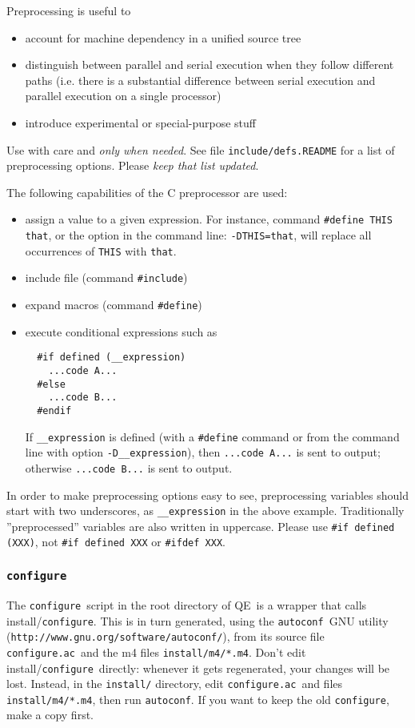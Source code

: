 \documentclass[12pt,a4paper]{article}
\def\qe{QE}
\def\configure{\texttt{configure}}
\def\configurac{\texttt{configure.ac}}
\def\autoconf{\texttt{autoconf}}
\begin{document}
Preprocessing is useful to
\begin{itemize}
\item account for machine dependency in a unified source tree
\item distinguish between parallel and serial execution when they
follow different paths (i.e. there is a substantial difference between
serial execution and parallel execution on a single processor)
\item  introduce experimental or special-purpose stuff
\end{itemize}
Use with care and {\em only when needed}. See file
\texttt{include/defs.README} for a list of preprocessing
options. Please {\em keep that list updated}.

The following capabilities of the C preprocessor are used:
\begin{itemize}
\item assign a value to a given expression. For instance, command
  \texttt{\#define THIS that}, or the option in the command line:
  \texttt{-DTHIS=that}, will replace all occurrences of \texttt{THIS}
  with \texttt{that}.
\item include file (command \texttt{\#include})
\item expand macros (command \texttt{\#define})
\item execute conditional expressions such as
\begin{verbatim}
  #if defined (__expression)
    ...code A...
  #else
    ...code B...
  #endif
\end{verbatim}
If \texttt{\_\_expression} is defined (with a \texttt{\#define} command
or from the command line with option \texttt{-D\_\_expression}),
then  \texttt{...code A...} is sent to output; otherwise
\texttt{...code B...} is sent to output.

\end{itemize}
In order to make  preprocessing options
easy to see, preprocessing variables should start with
two underscores, as \texttt{\_\_expression} in the above
example. Traditionally ''preprocessed'' variables are also written in
uppercase. Please use \verb|#if defined (XXX)|, not
\verb|#if defined XXX| or \verb|#ifdef XXX|.

\subsubsection{\configure}

\label{SubSec:conf}
The \configure\ script in the root directory of \qe\ is a wrapper
that calls install/\configure. This is in turn generated, using the
\autoconf\ GNU utility (\texttt{http://www.gnu.org/software/autoconf/}),
from its source file \configurac\ and the m4 files \texttt{install/m4/*.m4}.
Don't edit install/\configure\ directly: whenever it gets regenerated, your
changes will be lost. Instead, in the \texttt{install/} directory, edit
\configurac\ and files \texttt{install/m4/*.m4}, then run \autoconf.
If you want to keep the old \configure, make a copy first.
\end{document}
